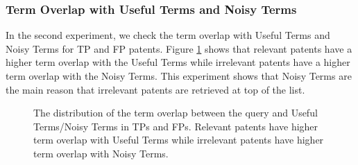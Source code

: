 \subsubsection{Term Overlap with Useful Terms and Noisy Terms}
In the second experiment, we check the term overlap with Useful Terms and Noisy Terms for TP and FP patents. Figure \ref{fig:usefulnoisy} shows that relevant patents have a higher term overlap with the Useful Terms while irrelevant patents have a higher term overlap with the Noisy Terms. This experiment shows that Noisy Terms are the main reason that irrelevant patents are retrieved at top of the list. 
\begin{figure}[t!]
\begin{centering}
 \hspace*{1.5cm}  
\par\end{centering} 

\protect\caption{The distribution of the term overlap between the query and Useful Terms/Noisy Terms in TPs and FPs. Relevant patents have higher term overlap with Useful Terms while irrelevant patents have higher term overlap with Noisy Terms.}
\label{fig:usefulnoisy}
\end{figure}
